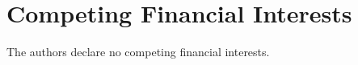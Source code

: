 \documentclass[journal, onecolumn]{IEEEtran}
\begin{document}
\section*{\large\bf{Competing Financial Interests}}
The authors declare no competing financial interests.









%
%
%
\end{document}
